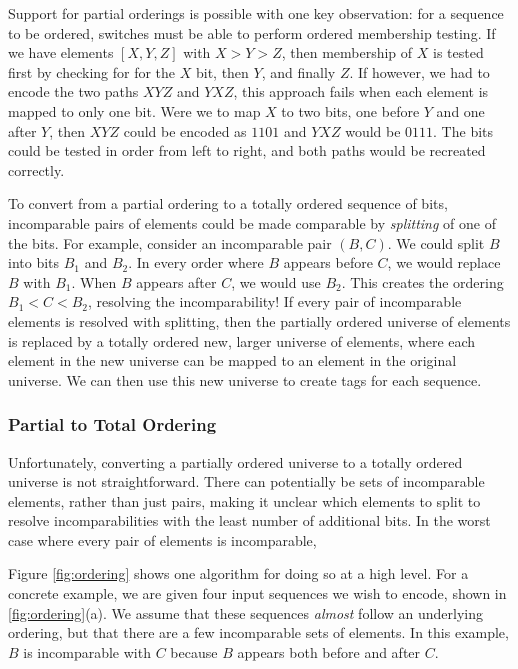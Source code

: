 Support for partial orderings is possible with one key observation: for a sequence to be ordered, switches must be able to perform ordered membership testing. If we have elements $[X,Y,Z]$ with $X > Y > Z$, then membership of $X$ is tested first by checking for for the $X$ bit, then $Y$, and finally $Z$. If however, we had to encode the two paths $XYZ$ and $YXZ$, this approach fails when each element is mapped to only one bit. Were we to map $X$ to two bits, one before $Y$ and one after $Y$, then $XYZ$ could be encoded as $1101$ and $YXZ$ would be $0111$. The bits could be tested in order from left to right, and both paths would be recreated correctly. 

To convert from a partial ordering to a totally ordered sequence of bits, incomparable pairs of elements could be made comparable by \textit{splitting} of one of the bits. For example, consider an incomparable pair $(B, C)$. We could split $B$ into bits $B_1$ and $B_2$. In every order where $B$ appears before $C$, we would replace $B$ with $B_1$. When $B$ appears after $C$, we would use $B_2$. This creates the ordering $B_1 < C < B_2$, resolving the incomparability! If every pair of incomparable elements is resolved with splitting, then the partially ordered universe of elements is replaced by a totally ordered new, larger universe of elements, where each element in the new universe can be mapped to an element in the original universe. We can then use this new universe to create tags for each sequence. 

\subsubsection{Partial to Total Ordering}

Unfortunately, converting a partially ordered universe to a totally ordered universe is not straightforward. There can potentially be sets of incomparable elements, rather than just pairs, making it unclear which elements to split to resolve incomparabilities with the least number of additional bits. In the worst case where every pair of elements is incomparable, 

 Figure \ref{fig:ordering} shows one algorithm for doing so at a high level. For a concrete example, we are given four input sequences we wish to encode, shown in \ref{fig:ordering}(a). We assume that these sequences \textit{almost} follow an underlying ordering, but that there are a few incomparable sets of elements. In this example, $B$ is incomparable with $C$ because $B$ appears both before and after $C$. 

